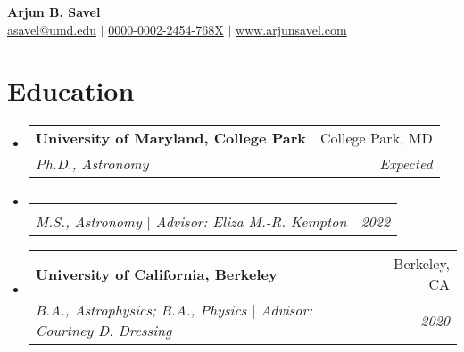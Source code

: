\documentclass[letterpaper,12pt]{article}
\makeatletter
\newcommand{\resumeItem}[2]{
  \item\small{
    \textbf{#1}{#2 \vspace{-2pt}}
  }
}
\newcommand{\resumeItemNoBullet}[2]{
  \item[]\small{
    \hspace{-9pt}\textbf{#1}{: #2 \vspace{-6pt}}
  }
}
\newcommand{\resumeSubheading}[4]{
  \vspace{-1pt}\item[]
  \begin{tabular*}{0.98\textwidth}{l@{\extracolsep{\fill}}r}
      \hspace{-10pt}\textbf{#1} & #2 \\
      \hspace{-10pt}\textit{\small#3} & \textit{\small #4} \\
    \end{tabular*}\vspace{-5pt}
}
\newcommand{\resumeSubHeadingListStart}{\begin{itemize}[leftmargin=*]}
\newcommand{\resumeSubHeadingListEnd}{\end{itemize}}
\newcommand{\resumeItemListStart}{\begin{itemize}}
\newcommand{\shorterSection}[1]{\vspace{-10pt}\section{#1}}
\makeatother
\begin{document}
\thispagestyle{empty}

\begin{center}
  \small \textbf{\large Arjun B. Savel} \\
  \textsf{\small \href{href="mailto:asavel@umd.edu"}{asavel@umd.edu}} $\vert$   \href{https://orcid.org/0000-0002-2454-768X/}{0000-0002-2454-768X} $\vert$ \href{www.arjunsavel.com}{www.arjunsavel.com} 
\end{center}
\vspace{-20pt}
\shorterSection{Education}
  \resumeSubHeadingListStart
    \resumeSubheading
      {University of Maryland, College Park}{College Park, MD}
      {Ph.D., Astronomy}{Expected}{
    }
    \vspace{-37pt}
    \resumeSubheading
    {}{}{M.S., Astronomy $\vert$ Advisor: Eliza M.-R. Kempton}{2022}{
    }
    \vspace{-20pt}
    \resumeSubheading
      {University of California, Berkeley}{Berkeley, CA}
      {B.A., Astrophysics; B.A., Physics $\vert$ Advisor: Courtney D. Dressing}{2020}{
    }
    
  \resumeSubHeadingListEnd
  
 
\vspace{-12pt}
\end{document}
